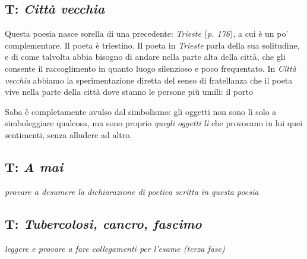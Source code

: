 \subsection{T: \textit{Città vecchia}}

Questa poesia nasce sorella di una precedente: \textit{Trieste} (\emph{p. 176}), a cui è un po' complementare. Il poeta è triestino.
Il poeta in \textit{Trieste} parla della sua solitudine, e di come talvolta abbia bisogno di andare nella parte alta della città, che gli consente il raccoglimento in quanto luogo silenzioso e poco frequentato.
In \textit{Città vecchia} abbiamo la sperimentazione diretta del senso di fratellanza che il poeta vive nella parte della città dove stanno le persone più umili: il porto


Saba è completamente avulso dal simbolismo: gli oggetti non sono lì solo a simboleggiare qualcosa, ma sono proprio \textit{quegli oggetti lì} che provocano in lui quei sentimenti, senza alludere ad altro.

\subsection{T: \textit{A mai}}

\emph{provare a desumere la dichiarazione di poetica scritta in questa poesia}

\subsection{T: \textit{Tubercolosi, cancro, fascimo}}

\emph{leggere e provare a fare collegamenti per l'esame (terza fase)}

